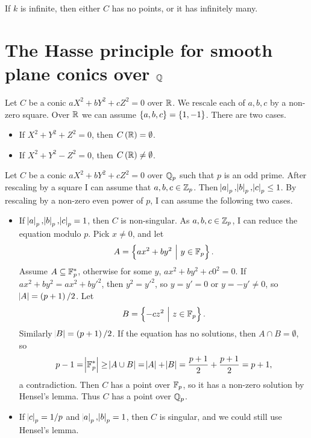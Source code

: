 \begin{corollary}
If $ k $ is infinite, then either $ C $ has no points, or it has infinitely many.
\end{corollary}

\pagebreak

\section{The Hasse principle for smooth plane conics over \texorpdfstring{$ \mathbb{Q} $}{Q}}


Let $ C $ be a conic $ aX^2 + bY^2 + cZ^2 = 0 $ over $ \mathbb{R} $. We rescale each of $ a, b, c $ by a non-zero square. Over $ \mathbb{R} $ we can assume $ \cbr{a, b, c} = \cbr{1, -1} $. There are two cases.
\begin{itemize}
\item If $ X^2 + Y^2 + Z^2 = 0 $, then $ C\br{\RR} = \emptyset $.
\item If $ X^2 + Y^2 - Z^2 = 0 $, then $ C\br{\RR} \ne \emptyset $.
\end{itemize}
Let $ C $ be a conic $ aX^2 + bY^2 + cZ^2 = 0 $ over $ \mathbb{Q}_p $ such that $ p $ is an odd prime. After rescaling by a square I can assume that $ a, b, c \in \mathbb{Z}_p $. Then $ \abs{a}_p, \abs{b}_p, \abs{c}_p \le 1 $. By rescaling by a non-zero even power of $ p $, I can assume the following two cases.
\begin{itemize}
\item If $ \abs{a}_p, \abs{b}_p, \abs{c}_p = 1 $, then $ C $ is non-singular. As $ a, b, c \in \mathbb{Z}_p $, I can reduce the equation modulo $ p $. Pick $ x \ne 0 $, and let
$$ A = \cbr{ax^2 + by^2 \st y \in \FF_p}. $$
Assume $ A \subseteq \mathbb{F}_p^* $, otherwise for some $ y $, $ ax^2 + by^2 + c0^2 = 0 $. If $ ax^2 + by^2 = ax^2 + by'^2 $, then $ y^2 = y'^2 $, so $ y = y' = 0 $ or $ y = -y' \ne 0 $, so $ \abs{A} = \br{p + 1} / 2 $. Let
$$ B = \cbr{-cz^2 \st z \in \FF_p}. $$
Similarly $ \abs{B} = \br{p + 1} / 2 $. If the equation has no solutions, then $ A \cap B = \emptyset $, so
$$ p - 1 = \abs{\mathbb{F}_p^*} \ge \abs{A \cup B} = \abs{A} + \abs{B} = \dfrac{p + 1}{2} + \dfrac{p + 1}{2} = p + 1, $$
a contradiction. Then $ C $ has a point over $ \mathbb{F}_p $, so it has a non-zero solution by Hensel's lemma. Thus $ C $ has a point over $ \mathbb{Q}_p $.
\item If $ \abs{c}_p = 1 / p $ and $ \abs{a}_p, \abs{b}_p = 1 $, then $ C $ is singular, and we could still use Hensel's lemma.
\end{itemize}
